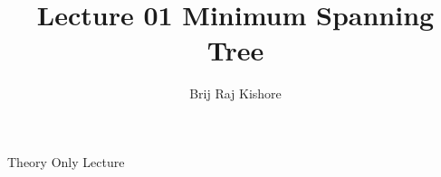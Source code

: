 \documentclass[12pt,twocolumn]{article}
\title{Lecture 01 Minimum Spanning Tree}
\date{}
\author{Brij Raj Kishore}
\begin{document}
	\maketitle
		Theory Only Lecture
\end{document}
